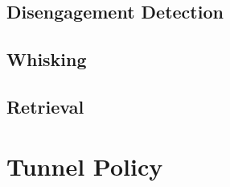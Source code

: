\subsection{Disengagement Detection}

\subsection{Whisking}

\subsection{Retrieval}


\section{Tunnel Policy}


\section{}
